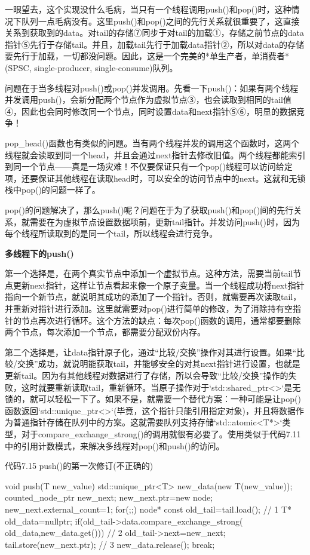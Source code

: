 一眼望去，这个实现没什么毛病，当只有一个线程调用push()和pop()时，这种情况下队列一点毛病没有。这里push()和pop()之间的先行关系就很重要了，这直接关系到获取到的data。对tail的存储⑦同步于对tail的加载①，存储之前节点的data指针⑤先行于存储tail。并且，加载tail先行于加载data指针②，所以对data的存储要先行于加载，一切都没问题。因此，这是一个完美的*单生产者，单消费者*(SPSC, single-producer, single-consume)队列。

问题在于当多线程对push()或pop()并发调用。先看一下push()：如果有两个线程并发调用push()，会新分配两个节点作为虚拟节点③，也会读取到相同的tail值④，因此也会同时修改同一个节点，同时设置data和next指针⑤⑥，明显的数据竞争！

pop\_head()函数也有类似的问题。当有两个线程并发的调用这个函数时，这两个线程就会读取到同一个head，并且会通过next指针去修改旧值。两个线程都能索引到同一个节点——真是一场灾难！不仅要保证只有一个pop()线程可以访问给定项，还要保证其他线程在读取head时，可以安全的访问节点中的next。这就和无锁栈中pop()的问题一样了。

pop()的问题解决了，那么push()呢？问题在于为了获取push()和pop()间的先行关系，就需要在为虚拟节点设置数据项前，更新tail指针。并发访问push()时，因为每个线程所读取到的是同一个tail，所以线程会进行竞争。

\textbf{多线程下的push()}

第一个选择是，在两个真实节点中添加一个虚拟节点。这种方法，需要当前tail节点更新next指针，这样让节点看起来像一个原子变量。当一个线程成功将next指针指向一个新节点，就说明其成功的添加了一个指针。否则，就需要再次读取tail，并重新对指针进行添加。这里就需要对pop()进行简单的修改，为了消除持有空指针的节点再次进行循环。这个方法的缺点：每次pop()函数的调用，通常都要删除两个节点，每次添加一个节点，都需要分配双份内存。

第二个选择是，让data指针原子化，通过“比较/交换”操作对其进行设置。如果“比较/交换”成功，就说明能获取tail，并能够安全的对其next指针进行设置，也就是更新tail。因为有其他线程对数据进行了存储，所以会导致“比较/交换”操作的失败，这时就要重新读取tail，重新循环。当原子操作对于`std::shared\_ptr<>`是无锁的，就可以轻松一下了。如果不是，就需要一个替代方案：一种可能是让pop()函数返回`std::unique\_ptr<>`(毕竟，这个指针只能引用指定对象)，并且将数据作为普通指针存储在队列中的方案。这就需要队列支持存储`std::atomic<T*>`类型，对于compare\_exchange\_strong()的调用就很有必要了。使用类似于代码7.11中的引用计数模式，来解决多线程对pop()和push()的访问。

代码7.15 push()的第一次修订(不正确的)

\begin{cpp}
void push(T new_value)
{
  std::unique_ptr<T> new_data(new T(new_value));
  counted_node_ptr new_next;
  new_next.ptr=new node;
  new_next.external_count=1;
  for(;;)
  {
    node* const old_tail=tail.load();  // 1
    T* old_data=nullptr;
    if(old_tail->data.compare_exchange_strong(
      old_data,new_data.get()))  // 2
    {
      old_tail->next=new_next;
      tail.store(new_next.ptr);  // 3
      new_data.release();
      break;
    }
  }
}
\end{cpp}

